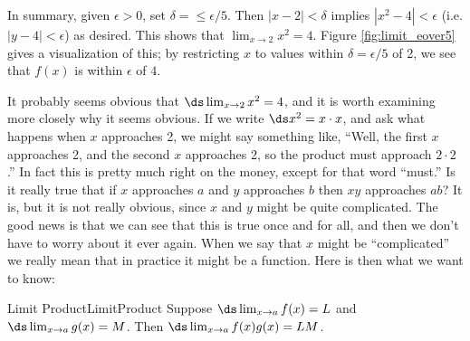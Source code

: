 \begin{solution}
{In summary, given $\epsilon > 0$, set $\delta=\leq\epsilon/5$.  Then $|x - 2| < \delta$ implies 
$|x^2 - 4|< \epsilon$ (i.e. $|y - 4|< \epsilon$) as desired.  This shows that $\displaystyle \lim_{x\rightarrow 2} x^2 = 4 $. Figure \ref{fig:limit_eover5} gives a visualization of this; by restricting $x$ to values within $\delta = \epsilon/5$ of 2, we see that $f(x)$ is within $\epsilon$ of $4$.
}
\end{solution}

It probably seems obvious that $\ds \lim_{x\to2}x^2=4$, and it is worth
examining more closely why it seems obvious. If we write $\ds x^2=x\cdot
x$, and ask what happens when $x$ approaches 2, we might say something
like, ``Well, the first $x$ approaches 2, and the second $x$
approaches 2, so the product must approach $2\cdot2$.'' In fact this is
pretty much right on the money, except for that word ``must.'' Is it
really true that if $x$ approaches $a$ and $y$ approaches $b$ then
$xy$ approaches $ab$? It is, but it is not really obvious, since $x$
and $y$ might be quite complicated. The good news is that we can see
that this is true once and for all, and then we don't have to worry
about it ever again. When we say that $x$ might be ``complicated'' we
really mean that in practice it might be a function. Here is then what
we want to know:

\begin{theorem}{Limit Product}{LimitProduct}
Suppose $\ds \lim_{x\to a} f(x)=L$ and $\ds \lim_{x\to a}g(x)=M$. Then
$\ds \lim_{x\to a} f(x)g(x) = LM$.
\end{theorem}


